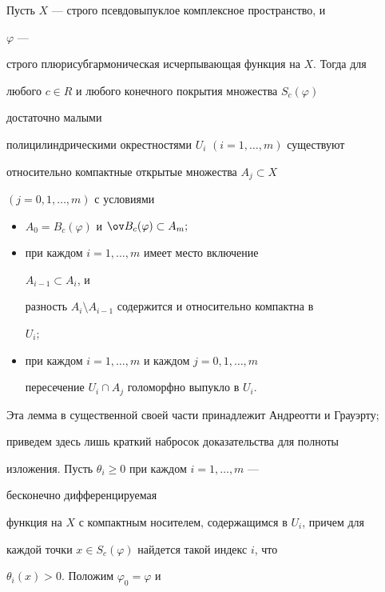 \begin{lem} 


Пусть $X$ --- строго псевдовыпуклое комплексное пространство, и 


$\varphi$ --- 


строго плюрисубгармоническая исчерпывающая функция на $X$. Тогда для 


любого $c\in R$ и любого конечного покрытия множества $S_c(\varphi)$ 


достаточно малыми 


полицилиндрическими окрестностями $U_i$ $(i=1,\dotsc,m)$ существуют 


относительно компактные открытые множества $A_j\subset X$ 


$(j=0,1,\dotsc,m)$ с условиями 


\begin{itemize} 


\item[a)] $A_0=B_c(\varphi)$ и $\ov B_c(\varphi)\subset A_m;$ 


\item[б)] при каждом $i=1,\dotsc,m$ имеет место включение 


$A_{i-1}\subset A_i$, и 


разность $A_i\setminus A_{i-1}$ содержится и относительно компактна в 


$U_i;$ 


\item[в)] при каждом $i=1,\dotsc,m$ и каждом $j=0,1,\dotsc,m$ 


пересечение $U_i\cap A_j$ голоморфно выпукло в $U_i$. 


\end{itemize} 


\end{lem} 


 


Эта лемма в существенной своей части принадлежит Андреотти и Грауэрту; 


приведем здесь лишь краткий набросок доказательства для полноты 


изложения. Пусть $\theta_i\ge 0$ при каждом $i=1,\dotsc,m$ --- 


бесконечно дифференцируемая 


функция на $X$ с компактным носителем, содержащимся в $U_i$, причем для 


каждой точки $x\in S_c(\varphi)$ найдется такой индекс $i$, что 


$\theta_i(x)>0$. Положим $\varphi_0=\varphi$ и 


